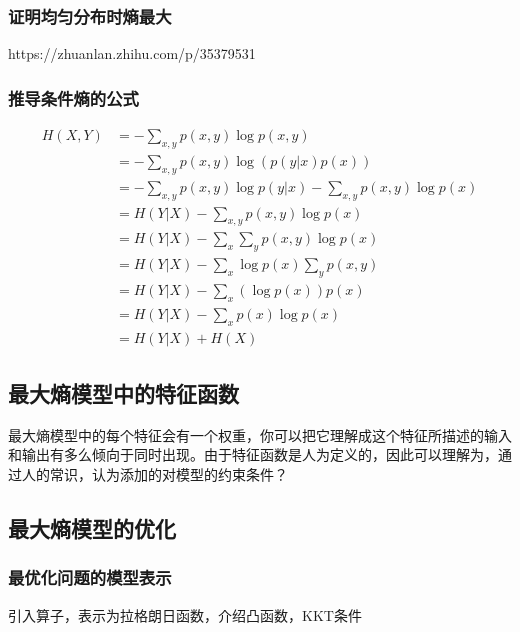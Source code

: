     \subsubsection{证明均匀分布时熵最大}
    https://zhuanlan.zhihu.com/p/35379531
    \subsubsection{推导条件熵的公式}
    \begin{equation}
        \begin{aligned} 
            H(X, Y) &=-\sum_{x, y} p(x, y) \log p(x, y) \\ 
            &=-\sum_{x, y} p(x, y) \log (p(y | x) p(x)) \\ 
            &=-\sum_{x, y} p(x, y) \log p(y | x)-\sum_{x, y} p(x, y) \log p(x) \\ 
            &=H(Y | X)-\sum_{x, y} p(x, y) \log p(x) \\
            &=H(Y | X)-\sum_{x} \sum_{y} p(x, y) \log p(x) \\ &=H(Y | X)-\sum_{x} \log p(x) \sum_{y} p(x, y) \\ 
            &=H(Y | X)-\sum_{x}(\log p(x)) p(x) \\ 
            &=H(Y | X)-\sum_{x} p(x) \log p(x) \\ 
            &=H(Y | X)+H(X)
        \end{aligned}
    \end{equation}
    \subsection{最大熵模型中的特征函数}
    最大熵模型中的每个特征会有一个权重，你可以把它理解成这个特征所描述的输入和输出有多么倾向于同时出现。由于特征函数是人为定义的，因此可以理解为，通过人的常识，认为添加的对模型的约束条件？
    \subsection{最大熵模型的优化}
    \subsubsection{最优化问题的模型表示}
    引入算子，表示为拉格朗日函数，介绍凸函数，KKT条件

